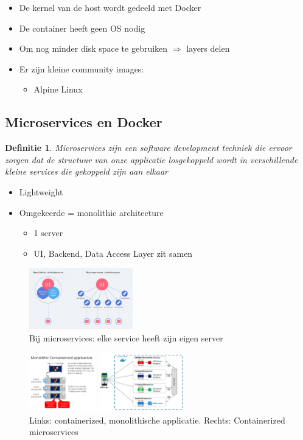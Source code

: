\documentclass{article}
\newtheorem{theorem}{Definitie}[section]
\begin{document}
\begin{itemize}
    \item De kernel van de host wordt gedeeld met Docker
    \item De container heeft geen OS nodig
    \item Om nog minder disk space te gebruiken $\Rightarrow$ layers delen
    \item Er zijn kleine community images:
    \begin{itemize}
        \item Alpine Linux
    \end{itemize}
\end{itemize}

\subsection{Microservices en Docker}

\begin{theorem}
    Microservices zijn een software development techniek die ervoor zorgen dat de 
    structuur van onze applicatie losgekoppeld wordt in verschillende kleine services
    die gekoppeld zijn aan elkaar
\end{theorem}

\begin{itemize}
    \item Lightweight
    \item Omgekeerde = monolithic architecture
    \begin{itemize}
        \item 1 server
        \item UI, Backend, Data Access Layer zit samen
    \end{itemize}
\end{itemize}

\begin{figure}[H]
    \centering
    \includegraphics[width=0.4\textwidth]{monolithic-vs-microservices.png}
    \caption{Bij microservices: elke service heeft zijn eigen server}
\end{figure}

\begin{figure}[H]
    \centering
    \includegraphics[width=0.6\textwidth]{monolithic-vs-microservices2.png}
    \caption{Links: containerized, monolithische applicatie. Rechts: Containerized microservices}
\end{figure}
\end{document}
